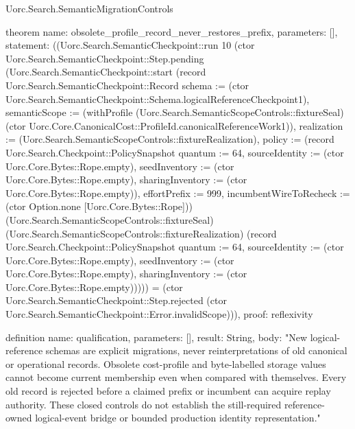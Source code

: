 \begin{lexlean}{Uorc.Search.SemanticMigrationControls}
\begin{semanticmodule}
theorem{
  name: obsolete_profile_record_never_restores_prefix,
  parameters: [],
  statement: ((Uorc.Search.SemanticCheckpoint::run 10 (ctor Uorc.Search.SemanticCheckpoint::Step.pending (Uorc.Search.SemanticCheckpoint::start (record Uorc.Search.SemanticCheckpoint::Record {schema := (ctor Uorc.Search.SemanticCheckpoint::Schema.logicalReferenceCheckpoint1), semanticScope := (withProfile (Uorc.Search.SemanticScopeControls::fixtureSeal) (ctor Uorc.Core.CanonicalCost::ProfileId.canonicalReferenceWork1)), realization := (Uorc.Search.SemanticScopeControls::fixtureRealization), policy := (record Uorc.Search.Checkpoint::PolicySnapshot {quantum := 64, sourceIdentity := (ctor Uorc.Core.Bytes::Rope.empty), seedInventory := (ctor Uorc.Core.Bytes::Rope.empty), sharingInventory := (ctor Uorc.Core.Bytes::Rope.empty)}), effortPrefix := 999, incumbentWireToRecheck := (ctor Option.none [Uorc.Core.Bytes::Rope])}) (Uorc.Search.SemanticScopeControls::fixtureSeal) (Uorc.Search.SemanticScopeControls::fixtureRealization) (record Uorc.Search.Checkpoint::PolicySnapshot {quantum := 64, sourceIdentity := (ctor Uorc.Core.Bytes::Rope.empty), seedInventory := (ctor Uorc.Core.Bytes::Rope.empty), sharingInventory := (ctor Uorc.Core.Bytes::Rope.empty)})))) = (ctor Uorc.Search.SemanticCheckpoint::Step.rejected (ctor Uorc.Search.SemanticCheckpoint::Error.invalidScope))),
  proof: reflexivity{}
}

definition{
  name: qualification,
  parameters: [],
  result: String,
  body: "New logical-reference schemas are explicit migrations, never reinterpretations of old canonical or operational records. Obsolete cost-profile and byte-labelled storage values cannot become current membership even when compared with themselves. Every old record is rejected before a claimed prefix or incumbent can acquire replay authority. These closed controls do not establish the still-required reference-owned logical-event bridge or bounded production identity representation."
}
\end{semanticmodule}
\end{lexlean}

